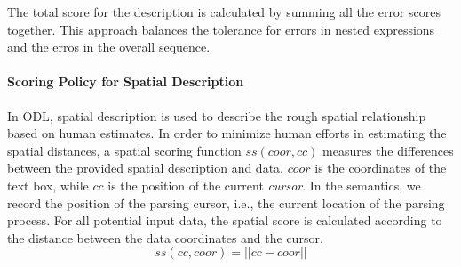 
The total score for the description is calculated by summing all 
the error scores together. This approach balances the tolerance for 
errors in nested expressions and the erros in the overall sequence. 

\paragraph{Scoring Policy for Spatial Description}
In ODL, spatial description is used to describe the rough spatial 
relationship based on human estimates. In order to minimize human efforts
in estimating the spatial distances, a spatial scoring function 
$ss(coor, cc)$ measures the differences between the provided spatial 
description and data.
$coor$ is the coordinates of the text box, while $cc$ is the position of 
the current {\em cursor}.  In the semantics, we record the position 
of the parsing cursor, i.e., the current location of the parsing process. 
For all potential input data, the spatial score is calculated according 
to the distance between the data coordinates and the cursor. 
\begin{equation}
	ss(cc, coor) = ||cc - coor||
\end{equation}

